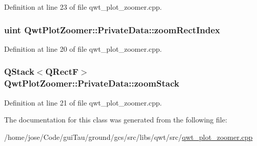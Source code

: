 Definition at line 23 of file qwt\-\_\-plot\-\_\-zoomer.\-cpp.

\hypertarget{class_qwt_plot_zoomer_1_1_private_data_aa0586228fab50c47933c87cac90ad6c8}{
\subsubsection[{zoom\-Rect\-Index}]{\setlength{\rightskip}{0pt plus 5cm}uint Qwt\-Plot\-Zoomer\-::\-Private\-Data\-::zoom\-Rect\-Index}}\label{class_qwt_plot_zoomer_1_1_private_data_aa0586228fab50c47933c87cac90ad6c8}


Definition at line 20 of file qwt\-\_\-plot\-\_\-zoomer.\-cpp.

\hypertarget{class_qwt_plot_zoomer_1_1_private_data_abc4d63bb7631fcfe6e2e8af2fef8648d}{
\subsubsection[{zoom\-Stack}]{\setlength{\rightskip}{0pt plus 5cm}Q\-Stack$<$Q\-Rect\-F$>$ Qwt\-Plot\-Zoomer\-::\-Private\-Data\-::zoom\-Stack}}\label{class_qwt_plot_zoomer_1_1_private_data_abc4d63bb7631fcfe6e2e8af2fef8648d}


Definition at line 21 of file qwt\-\_\-plot\-\_\-zoomer.\-cpp.



The documentation for this class was generated from the following file\-:\begin{DoxyCompactItemize}
\item 
/home/jose/\-Code/gui\-Tau/ground/gcs/src/libs/qwt/src/\hyperlink{qwt__plot__zoomer_8cpp}{qwt\-\_\-plot\-\_\-zoomer.\-cpp}\end{DoxyCompactItemize}
